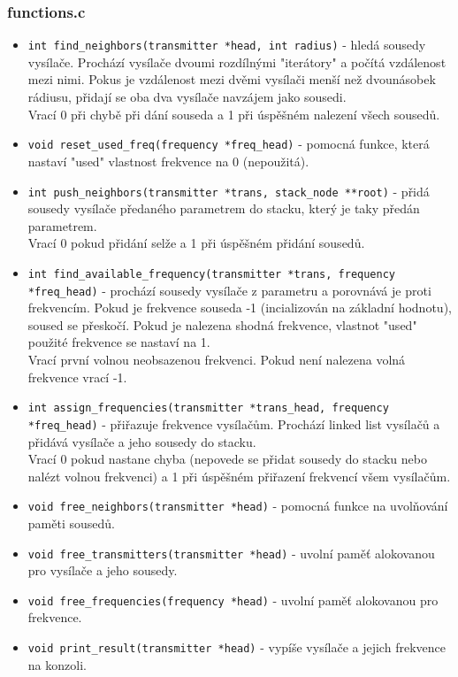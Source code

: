 \documentclass[12pt]{article}
\begin{document}
\subsubsection{functions.c}
%
\begin{itemize}
	\item \texttt{int find\_neighbors(transmitter *head, int radius)} - 
		hledá sousedy vysílače. Prochází vysílače dvoumi rozdílnými
		"iterátory" a počítá vzdálenost mezi nimi. Pokus je vzdálenost
		mezi dvěmi vysílači menší než dvounásobek rádiusu, přidají se
		oba dva vysílače navzájem jako sousedi.\\

		Vrací 0 při chybě při dání souseda a 1 při úspěšném nalezení
		všech sousedů.
	\item \texttt{void reset\_used\_freq(frequency *freq\_head)} - pomocná
		funkce, která nastaví "used" vlastnost frekvence na 0
		(nepoužitá).
	\item \texttt{int push\_neighbors(transmitter *trans,
		stack\_node **root)} - přidá sousedy vysílače předaného
		parametrem do stacku, který je taky předán parametrem.\\

		Vrací 0 pokud přidání selže a 1 při úspěšném přidání sousedů.
	\item \texttt{int find\_available\_frequency(transmitter *trans,
		frequency *freq\_head)} - prochází sousedy vysílače z 
		parametru a porovnává je proti frekvencím. Pokud je frekvence 
		souseda -1 (incializován na základní hodnotu), soused se 
		přeskočí. Pokud je nalezena shodná frekvence, vlastnot "used"
		použité frekvence se nastaví na 1.\\

		Vrací první volnou neobsazenou frekvenci. Pokud není nalezena 
		volná frekvence vrací -1.
	\item \texttt{int assign\_frequencies(transmitter *trans\_head,
		frequency *freq\_head)} - přiřazuje frekvence vysílačům. 
		Prochází linked list vysílačů a přidává vysílače a jeho sousedy
		do stacku.\\

		Vrací 0 pokud nastane chyba (nepovede se přidat sousedy do
		stacku nebo nalézt volnou frekvenci) a 1 při úspěšném 
		přiřazení frekvencí všem vysílačům.
	\item \texttt{void free\_neighbors(transmitter *head)} - pomocná funkce
		na uvolňování paměti sousedů.
	\item \texttt{void free\_transmitters(transmitter *head)} - uvolní paměť
		alokovanou pro vysílače a jeho sousedy.
	\item \texttt{void free\_frequencies(frequency *head)} - uvolní paměť
		alokovanou pro frekvence.
	\item \texttt{void print\_result(transmitter *head)} - vypíše vysílače
		a jejich frekvence na konzoli.
\end{itemize}
%
\end{document}
